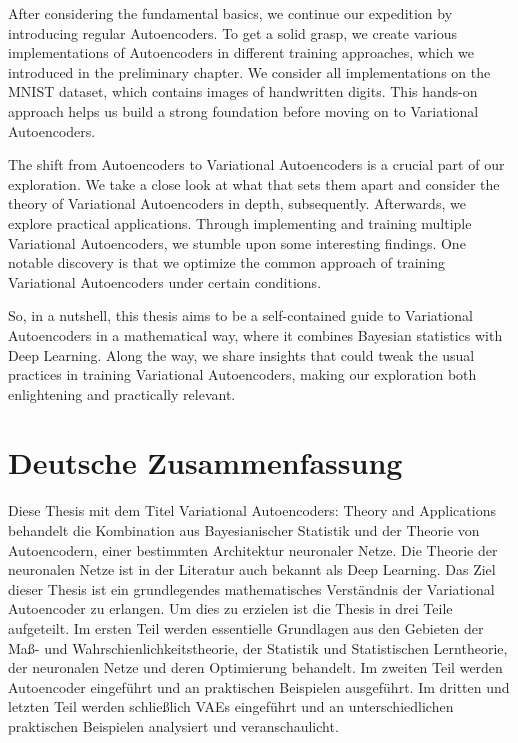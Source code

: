 \documentclass[11pt, twoside, a4paper]{book}
\theoremstyle{plain}
\theoremstyle{definition}
\theoremstyle{plain}
\begin{document}
After considering the fundamental basics, we continue our expedition by introducing regular Autoencoders. To get a solid grasp, we create various implementations of Autoencoders in different training approaches, which we introduced in the preliminary chapter. We consider all implementations on the MNIST dataset, which contains images of handwritten digits. This hands-on approach helps us build a strong foundation before moving on to Variational Autoencoders.

The shift from Autoencoders to Variational Autoencoders is a crucial part of our exploration. We take a close look at what that sets them apart and consider the theory of Variational Autoencoders in depth, subsequently. Afterwards, we explore practical applications. Through implementing and training multiple Variational Autoencoders, we stumble upon some interesting findings. One notable discovery is that we optimize the common approach of training Variational Autoencoders under certain conditions.

So, in a nutshell, this thesis aims to be a self-contained guide to Variational Autoencoders in a mathematical way, where it combines Bayesian statistics with Deep Learning. Along the way, we share insights that could tweak the usual practices in training Variational Autoencoders, making our exploration both enlightening and practically relevant.








\newpage
{}

\section*{Deutsche Zusammenfassung}

Diese Thesis mit dem Titel \glqq Variational Autoencoders: Theory and Applications\grqq{} behandelt die Kombination aus Bayesianischer Statistik und der Theorie von Autoencodern, einer bestimmten Architektur neuronaler Netze. Die Theorie der neuronalen Netze ist in der Literatur auch bekannt als \glqq Deep Learning\grqq{}. Das Ziel dieser Thesis ist ein grundlegendes mathematisches Verständnis der Variational Autoencoder zu erlangen. Um dies zu erzielen ist die Thesis in drei Teile aufgeteilt. Im ersten Teil werden essentielle Grundlagen aus den Gebieten der Maß- und Wahrschienlichkeitstheorie, der Statistik und Statistischen Lerntheorie, der neuronalen Netze und deren Optimierung behandelt. Im zweiten Teil werden Autoencoder eingeführt und an praktischen Beispielen ausgeführt. Im dritten und letzten Teil werden schließlich VAEs eingeführt und an unterschiedlichen praktischen Beispielen analysiert und veranschaulicht.
\end{document}
